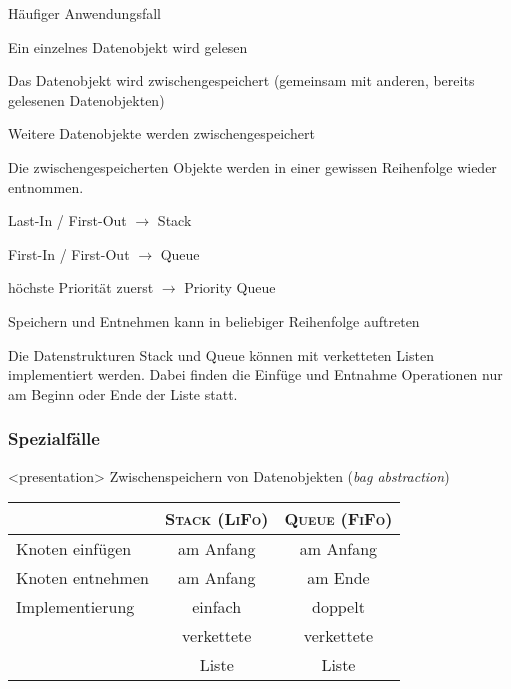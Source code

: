 \begin{multicols}{2}
Häufiger Anwendungsfall
\begin{compactitem}
\item Ein einzelnes Datenobjekt wird gelesen
\item Das Datenobjekt wird zwischengespeichert (gemeinsam mit anderen, bereits gelesenen Datenobjekten)
\item Weitere Datenobjekte werden zwischengespeichert
\item Die zwischengespeicherten Objekte werden in einer gewissen Reihenfolge wieder entnommen.
	\begin{compactitem}
	\item Last-In / First-Out  $\rightarrow$ Stack
	\item First-In / First-Out $\rightarrow$ Queue
	\item höchste Priorität zuerst $\rightarrow$ Priority Queue
	\end{compactitem}
\item Speichern und Entnehmen kann in beliebiger Reihenfolge auftreten
\end{compactitem}

Die Datenstrukturen Stack und Queue können mit verketteten Listen implementiert werden.
Dabei finden die Einfüge und Entnahme Operationen nur am Beginn oder Ende der Liste statt.

\begin{frame}[fragile]
\frametitle<presentation>{Spezialfälle}

\begin{onlyenv}<presentation>
Zwischenspeichern von Datenobjekten (\textit{bag abstraction})
\end{onlyenv}

\begin{center}
\begin{tabular}{p{3.6cm}|cc}
\textsc{} & \textsc{Stack (LiFo)} & \textsc{Queue (FiFo)} \\
\hline
Knoten einfügen                    & am Anfang & am Anfang\\
\hline
Knoten entnehmen & am Anfang & am Ende\\
\hline
{Implementierung} & {einfach} & {doppelt} \\
& {verkettete} & {verkettete} \\
& {Liste} & {Liste} \\
\hline
\end{tabular}
\end{center}

\end{frame}

\end{multicols}


